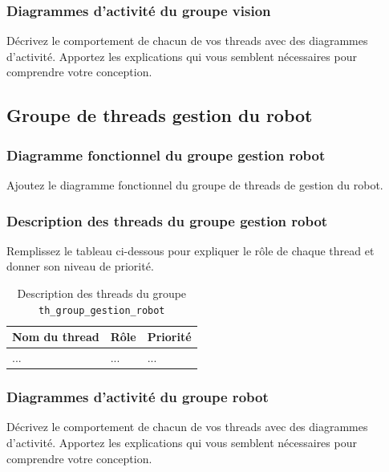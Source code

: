 \documentclass[11pt, a4paper]{paper}
\begin{document}
\subsubsection{Diagrammes d'activité du groupe vision}
{\color{blue}Décrivez le comportement de chacun de vos threads avec des diagrammes d'activité. Apportez les explications qui vous semblent nécessaires pour comprendre votre conception.}


\subsection{Groupe de threads gestion du robot}

\subsubsection{Diagramme fonctionnel du groupe gestion robot}
{\color{blue} Ajoutez le diagramme fonctionnel du groupe de threads de gestion du robot.}

\subsubsection{Description des threads du groupe gestion robot}
{\color{red} Remplissez le tableau ci-dessous pour expliquer le rôle de chaque thread et donner son niveau de priorité.}


\begin{table}[htp]
\caption{Description des threads du groupe {\tt th\_group\_gestion\_robot}}
\begin{center}
\begin{tabular}{|p{3cm}|p{8.5cm}|p{2cm}|}
\hline
\bf Nom du thread &	\bf Rôle &	\bf Priorité \\
\hline
\hline
\color{blue}... &	\color{blue}... &	\color{blue}...\\
\hline
\end{tabular}
\end{center}
\label{tab:gt_moniteur}
\end{table}%
\FloatBarrier

\subsubsection{Diagrammes d'activité du groupe robot}
{\color{blue}Décrivez le comportement de chacun de vos threads avec des diagrammes d'activité. Apportez les explications qui vous semblent nécessaires pour comprendre votre conception.}
\end{document}
